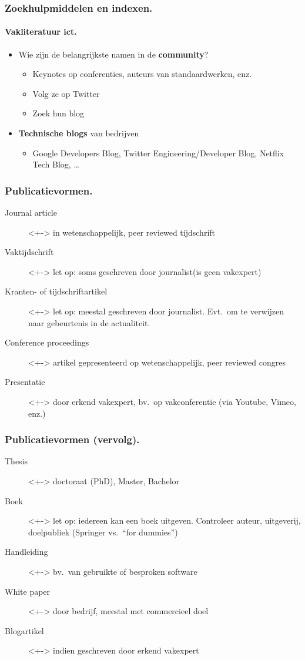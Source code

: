 \documentclass[aspectratio=169]{beamer}
\begin{document}
\begin{frame}
  \frametitle{Zoekhulpmiddelen en indexen.}
  \framesubtitle{Vakliteratuur ict.}

  \begin{itemize}
    \item<+-> Wie zijn de belangrijkste namen in de \textbf{community}?
      \begin{itemize}
        \item Keynotes op conferenties, auteurs van standaardwerken, enz.
        \item Volg ze op Twitter
        \item Zoek hun blog
      \end{itemize}
    \item<+-> \textbf{Technische blogs} van bedrijven
      \begin{itemize}
        \item Google Developers Blog, Twitter Engineering/Developer Blog, Netflix Tech Blog, \dots
      \end{itemize}
  \end{itemize}
\end{frame}

\begin{frame}
  \frametitle{Publicatievormen.}

  \begin{description}
    \item[Journal article]<+-> in wetenschappelijk, peer reviewed tijdschrift
    \item[Vaktijdschrift]<+-> let op: soms geschreven door journalist\linebreak(is geen vakexpert)
    \item[Kranten- of tijdschriftartikel] <+-> let op: meestal geschreven door journalist. Evt.~om te verwijzen naar gebeurtenis in de actualiteit.
      \item[Conference proceedings]<+-> artikel gepresenteerd op wetenschappelijk, peer reviewed congres
      \item[Presentatie]<+-> door erkend vakexpert, bv.\ op vakconferentie (via Youtube, Vimeo, enz.)
  \end{description}
\end{frame}

\begin{frame}
  \frametitle{Publicatievormen (vervolg).}

  \begin{description}
    \item[Thesis]<+-> doctoraat (PhD), Master, Bachelor
    \item[Boek]<+-> let op: iedereen kan een boek uitgeven. Controleer auteur, uitgeverij, doelpubliek (Springer vs.\ ``for dummies'')
    \item[Handleiding]<+-> bv.\ van gebruikte of besproken software
    \item[White paper]<+-> door bedrijf, meestal met commercieel doel
    \item[Blogartikel]<+-> indien geschreven door erkend vakexpert
  \end{description}
\end{frame}
\end{document}
